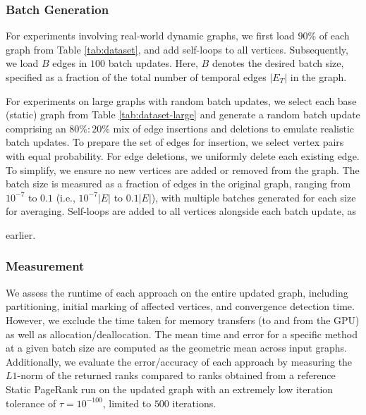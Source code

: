



\subsubsection{Batch Generation}
\label{sec:batch-generation}

For experiments involving real-world dynamic graphs, we first load $90\%$ of each graph from Table \ref{tab:dataset}, and add self-loops to all vertices. Subsequently, we load $B$ edges in $100$ batch updates. Here, $B$ denotes the desired batch size, specified as a fraction of the total number of temporal edges $|E_T|$ in the graph. For experiments on large graphs with random batch updates, we select each base (static) graph from Table \ref{tab:dataset-large} and generate a random batch update comprising an $80\% : 20\%$ mix of edge insertions and deletions to emulate realistic batch updates. To prepare the set of edges for insertion, we select vertex pairs with equal probability. For edge deletions, we uniformly delete each existing edge. To simplify, we ensure no new vertices are added or removed from the graph. The batch size is measured as a fraction of edges in the original graph, ranging from $10^{-7}$ to $0.1$ (i.e., $10^{-7}|E|$ to $0.1|E|$), with multiple batches generated for each size for averaging. Self-loops are added to all vertices alongside each batch update, as earlier.


\subsubsection{Measurement}
\label{sec:measurement}

We assess the runtime of each approach on the entire updated graph, including partitioning, initial marking of affected vertices, and convergence detection time. However, we exclude the time taken for memory transfers (to and from the GPU) as well as allocation/deallocation. The mean time and error for a specific method at a given batch size are computed as the geometric mean across input graphs. Additionally, we evaluate the error/accuracy of each approach by measuring the $L1$-norm \cite{ohsaka2015efficient} of the returned ranks compared to ranks obtained from a reference Static PageRank run on the updated graph with an extremely low iteration tolerance of $\tau = 10^{-100}$, limited to $500$ iterations.




